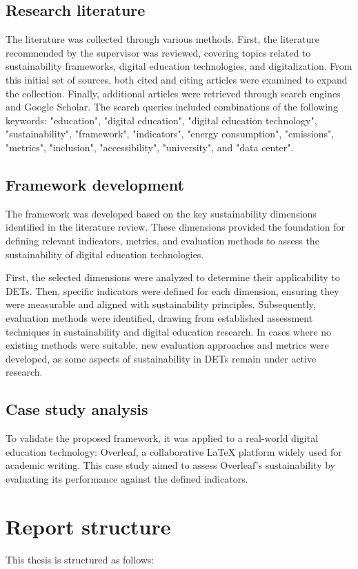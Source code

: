 \subsection{Research literature}
The literature was collected through various methods. First, the literature recommended by the supervisor was reviewed, covering topics related to sustainability frameworks, digital education technologies, and digitalization. From this initial set of sources, both cited and citing articles were examined to expand the collection. Finally, additional articles were retrieved through search engines and Google Scholar. The search queries included combinations of the following keywords: "education", "digital education", "digital education technology", "sustainability", "framework", "indicators", "energy consumption", "emissions", "metrics", "inclusion", "accessibility", "university", and "data center".

\subsection{Framework development}
The framework was developed based on the key sustainability dimensions identified in the literature review. These dimensions provided the foundation for defining relevant indicators, metrics, and evaluation methods to assess the sustainability of digital education technologies. 

First, the selected dimensions were analyzed to determine their applicability to DETs. Then, specific indicators were defined for each dimension, ensuring they were measurable and aligned with sustainability principles. Subsequently, evaluation methods were identified, drawing from established assessment techniques in sustainability and digital education research. In cases where no existing methods were suitable, new evaluation approaches and metrics were developed, as some aspects of sustainability in DETs remain under active research.

\subsection{Case study analysis}
To validate the proposed framework, it was applied to a real-world digital education technology: Overleaf, a collaborative LaTeX platform widely used for academic writing. This case study aimed to assess Overleaf’s sustainability by evaluating its performance against the defined indicators.

\section{Report structure}
This thesis is structured as follows:

